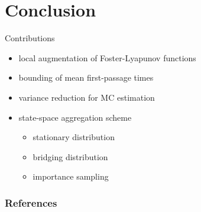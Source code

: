 \documentclass[9pt]{beamer}
\begin{document}
\section{Conclusion}
\begin{frame}{Contributions}
    \begin{itemize}
        \item local augmentation of Foster-Lyapunov functions
        \item bounding of mean first-passage times \parencite{backenkohler2019bounding}
        \item variance reduction for MC estimation \parencite{backenkohler2019control,backenkohler2021variance}
        \item state-space aggregation scheme
            \begin{itemize}
                \item stationary distribution \parencite{backenkohler2021abstraction}
                \item bridging distribution \parencite{backenkohler2020analysis}
                \item importance sampling
            \end{itemize}
    \end{itemize}
\end{frame}

\begin{frame}[allowframebreaks]
    \frametitle{References}
%        
    \printbibliography
\end{frame}
\end{document}
